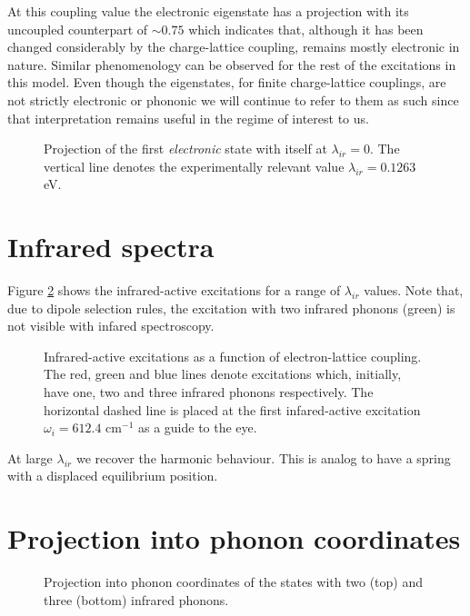 At this coupling value the electronic eigenstate has a projection with its uncoupled counterpart of $\sim 0.75$ which indicates that, although it has been changed considerably by the charge-lattice coupling, remains mostly electronic in nature.
Similar phenomenology can be observed for the rest of the excitations in this model.
Even though the eigenstates, for finite charge-lattice couplings, are not strictly electronic or phononic we will continue to refer to them as such since that interpretation remains useful in the regime of interest to us.
%
\begin{figure}
  \centering
  
  \caption[Projection of the first \textit{electronic} state with itself at $\lambda_{ir}=0$.]
  {Projection of the first \textit{electronic} state with itself at $\lambda_{ir}=0$.
    The vertical line denotes the experimentally relevant value $\lambda_{ir}=0.1263$ eV.}
  \label{fig:electr-proj}
\end{figure}

\section{Infrared spectra}

Figure \ref{fig:irSpectra} shows the infrared-active excitations for a range of $\lambda_{ir}$ values.
Note that, due to dipole selection rules, the excitation with two infrared phonons (green) is not visible with infared spectroscopy.

\begin{figure}
  \centering
  
  \caption[Infrared-active excitations as a function of electron-lattice coupling.]
  {Infrared-active excitations as a function of electron-lattice coupling.
  The red, green and blue lines denote excitations which, initially, have one, two and three infrared phonons respectively.
  The horizontal dashed line is placed at the first infared-active excitation $\omega_i=612.4$ cm$^{-1}$ as a guide to the eye.}
  \label{fig:irSpectra}
\end{figure}


At large $\lambda_{ir}$ we recover the harmonic behaviour. This is analog to have a spring with a displaced equilibrium position.

\section{Projection into phonon coordinates}

\begin{figure}
  \centering
  
  \caption{Projection into phonon coordinates of the states with two (top) and three (bottom) infrared phonons.}
  \label{fig:phononProj2-3ir}
\end{figure}

